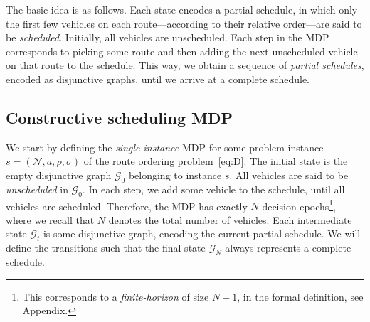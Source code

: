 \documentclass[a4paper]{report}
\theoremstyle{definition}
\theoremstyle{plain}
\begin{document}
The basic idea is as follows.
%
Each state encodes a partial schedule, in which only the first few vehicles on
each route---according to their relative order---are said to be
\emph{scheduled}.
%
Initially, all vehicles are unscheduled.
%
Each step in the MDP corresponds to picking some route and then adding the next
unscheduled vehicle on that route to the schedule.
%
This way, we obtain a sequence of \emph{partial schedules}, encoded as
disjunctive graphs, until we arrive at a complete schedule.

\clearpage

\subsection{Constructive scheduling MDP}\label{sec:MDP}



We start by defining the \emph{single-instance} MDP for some problem instance
$s = (\mathcal{N}, a, \rho, \sigma)$ of the route ordering problem~\eqref{eq:D}.
%
The initial state is the empty disjunctive graph $\mathcal{G}_0$ belonging to
instance $s$.
%
All vehicles are said to be \emph{unscheduled} in $\mathcal{G}_0$.
%
In each step, we add some vehicle to the schedule, until all vehicles are
scheduled.
%
Therefore, the MDP has exactly $N$ decision epochs\footnote{This corresponds to
  a \emph{finite-horizon} of size $N+1$, in the formal definition, see
  Appendix.}, where we recall that $N$ denotes the total number of vehicles.
%
Each intermediate state $\mathcal{G}_t$ is some disjunctive graph, encoding the
current partial schedule.
%
We will define the transitions such that the final state $\mathcal{G}_N$ always
represents a complete schedule.
\end{document}

